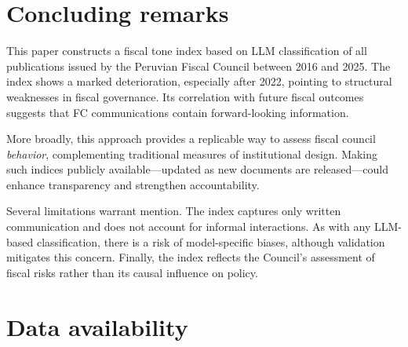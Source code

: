 \documentclass[a4paper, fleqn, 12pt]{article}
\begin{document}



\section{Concluding remarks}

This paper constructs a fiscal tone index based on LLM classification of all publications issued by the Peruvian Fiscal Council between 2016 and 2025. The index shows a marked deterioration, especially after 2022, pointing to structural weaknesses in fiscal governance. Its correlation with future fiscal outcomes suggests that FC communications contain forward-looking information.

More broadly, this approach provides a replicable way to assess fiscal council \emph{behavior}, complementing traditional measures of institutional design. Making such indices publicly available—updated as new documents are released—could enhance transparency and strengthen accountability.

Several limitations warrant mention. The index captures only written communication and does not account for informal interactions. As with any LLM-based classification, there is a risk of model-specific biases, although validation mitigates this concern. Finally, the index reflects the Council’s assessment of fiscal risks rather than its causal influence on policy.



\section*{Data availability}
\end{document}
